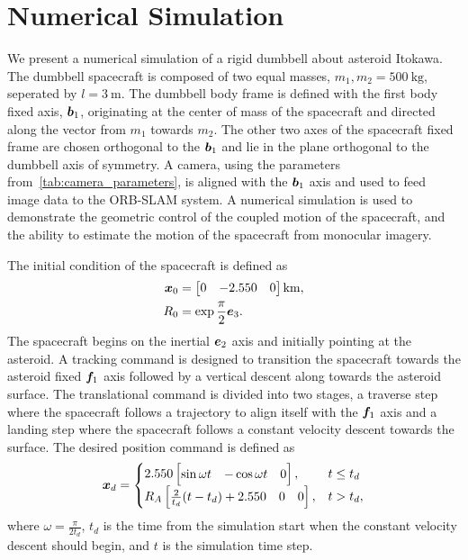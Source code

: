 \documentclass[letterpaper, paper,11pt]{AAS}		%
\begin{document}
\section{Numerical Simulation}\label{sec:simulation}

We present a numerical simulation of a rigid dumbbell about asteroid Itokawa.
The dumbbell spacecraft is composed of two equal masses, \( m_1, m_2 = \SI{500}{\kilo\gram} \), seperated by \( l = \SI{3}{\meter} \).
The dumbbell body frame is defined with the first body fixed axis, \( \bm{b}_1 \), originating at the center of mass of the spacecraft and directed along the vector from \( m_1 \) towards \( m_2 \).
The other two axes of the spacecraft fixed frame are chosen orthogonal to the \( \bm{b}_1 \) and lie in the plane orthogonal to the dumbbell axis of symmetry. 
A camera, using the parameters from~\cref{tab:camera_parameters}, is aligned with the \( \bm{b}_1 \) axis and used to feed image data to the ORB-SLAM system.
A numerical simulation is used to demonstrate the geometric control of the coupled motion of the spacecraft, and the ability to estimate the motion of the spacecraft from monocular imagery.

The initial condition of the spacecraft is defined as
\begin{align}
    \bm{x}_0 &= \begin{bmatrix} 0 & -2.550 & 0 \end{bmatrix} \si{\kilo\meter}, \\
    R_0 &= \exp { \frac{\pi}{2} \bm{e}_3 } .
\end{align}
The spacecraft begins on the inertial \( \bm{e}_2 \) axis and initially pointing at the asteroid. 
A tracking command is designed to transition the spacecraft towards the asteroid fixed \( \bm{f}_1  \) axis followed by a vertical descent along towards the asteroid surface.
The translational command is divided into two stages, a traverse step where the spacecraft follows a trajectory to align itself with the \( \bm{f}_1 \) axis and a landing step where the spacecraft follows a constant velocity descent towards the surface. 
The desired position command is defined as
\begin{align}
    \bm{x}_d = 
    \begin{cases}
        2.550 \begin{bmatrix} \sin{\omega t} & -\cos{\omega t} & 0 \end{bmatrix}, & t \leq t_d \\
        R_A \begin{bmatrix} \frac{2}{t_d} (t - t_d) + 2.550 & 0 & 0 \end{bmatrix}, & t > t_d , 
    \end{cases}
\end{align}
where \( \omega = \frac{\pi}{2 t_d} \), \( t_d \) is the time from the simulation start when the constant velocity descent should begin, and \( t \) is the simulation time step.
\end{document}
